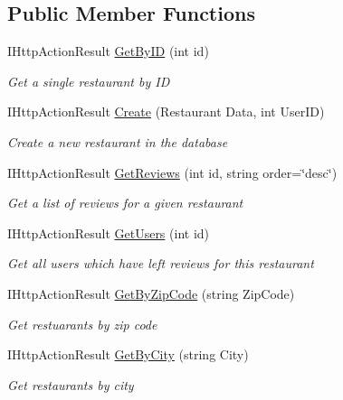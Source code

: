 \subsection*{Public Member Functions}
\begin{DoxyCompactItemize}
\item 
I\+Http\+Action\+Result \hyperlink{class_restaurant_reviews_1_1_a_p_i_1_1_controllers_1_1_restaurant_controller_a3b2e04a167823d76ea16c71c949b888f}{Get\+By\+ID} (int id)
\begin{DoxyCompactList}\small\item\em Get a single restaurant by ID \end{DoxyCompactList}\item 
I\+Http\+Action\+Result \hyperlink{class_restaurant_reviews_1_1_a_p_i_1_1_controllers_1_1_restaurant_controller_a8f91f199a1dbce68756f5379805e3f20}{Create} (Restaurant Data, int User\+ID)
\begin{DoxyCompactList}\small\item\em Create a new restaurant in the database \end{DoxyCompactList}\item 
I\+Http\+Action\+Result \hyperlink{class_restaurant_reviews_1_1_a_p_i_1_1_controllers_1_1_restaurant_controller_aa1911ffc31b2f4a38babb4f57873c360}{Get\+Reviews} (int id, string order=\char`\"{}desc\char`\"{})
\begin{DoxyCompactList}\small\item\em Get a list of reviews for a given restaurant \end{DoxyCompactList}\item 
I\+Http\+Action\+Result \hyperlink{class_restaurant_reviews_1_1_a_p_i_1_1_controllers_1_1_restaurant_controller_a1bea70cd71023705a9a4bf3305288573}{Get\+Users} (int id)
\begin{DoxyCompactList}\small\item\em Get all users which have left reviews for this restaurant \end{DoxyCompactList}\item 
I\+Http\+Action\+Result \hyperlink{class_restaurant_reviews_1_1_a_p_i_1_1_controllers_1_1_restaurant_controller_a5565db6cba45b287a1fe47b7546f4c4a}{Get\+By\+Zip\+Code} (string Zip\+Code)
\begin{DoxyCompactList}\small\item\em Get restuarants by zip code \end{DoxyCompactList}\item 
I\+Http\+Action\+Result \hyperlink{class_restaurant_reviews_1_1_a_p_i_1_1_controllers_1_1_restaurant_controller_a778d1c97cbb7cf01208f72524d457f10}{Get\+By\+City} (string City)
\begin{DoxyCompactList}\small\item\em Get restaurants by city \end{DoxyCompactList}\end{DoxyCompactItemize}


